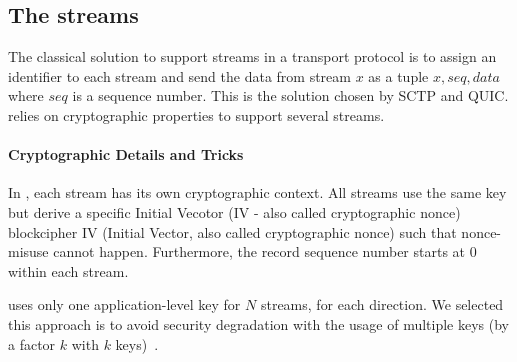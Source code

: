 
\subsection{The \tcpls streams}
\label{sec:datastreams}

The classical solution to support streams in a transport protocol is to assign an identifier to each stream and send the data from stream $x$ as a tuple $x,seq,data$ where $seq$ is a sequence number. This is the solution chosen by SCTP\cite{rfc4960} and QUIC\cite{draft-ietf-quic-transport}. \tcpls relies on
cryptographic properties to support several streams.

\paragraph*{Cryptographic Details and Tricks}
In \tcpls, each stream has its own cryptographic context. All streams use
the same key but derive a specific Initial Vecotor (IV - also called cryptographic nonce) blockcipher IV (Initial Vector, also called cryptographic nonce)
such that nonce-misuse cannot happen. Furthermore, the \tcpls record sequence number starts at $0$ within each stream.

\tcpls uses only one application-level key for $N$ streams,
for each direction. We selected this approach is to avoid security
degradation with the usage of multiple keys (by a factor $k$ with $k$
keys)~\cite{chatterjee2011another}.

